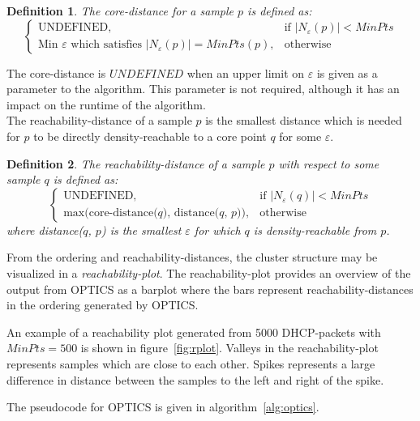 \documentclass[a4paper]{report}
\newtheorem*{definition}{Definition}
\begin{document}
\begin{definition}
    The core-distance for a sample $p$ is defined as:
\[
    \begin{cases}
        \text{UNDEFINED}, & \text{if $|N_{\varepsilon}(p)| < MinPts$}\\
        \text{Min $\varepsilon$ which satisfies  $|N_{\varepsilon}(p)| = MinPts$}(p), & \text{otherwise}
    \end{cases}
\]
\end{definition}

The core-distance is $UNDEFINED$ when an upper limit on $\varepsilon$ is
given as a parameter to the algorithm. This parameter is not required,
although it has an impact on the runtime of the algorithm.
\\[0.5cm]
The reachability-distance of a sample $p$ is the smallest distance which is
needed for $p$ to be directly density-reachable to a core point $q$ for some
$\varepsilon$. 

\begin{definition}
    The reachability-distance of a sample $p$ with respect to some sample $q$
    is defined as:
\[
    \begin{cases}
        \text{UNDEFINED}, & \text{if $|N_{\varepsilon}(q)| < MinPts$}\\
        \text{max(core-distance($q$), distance($q$, $p$))}, & \text{otherwise}
    \end{cases}
\]
    where distance($q$, $p$) is the smallest $\varepsilon$ for which $q$ is
    density-reachable from $p$.
\end{definition}

From the ordering and reachability-distances, the cluster structure may be
visualized in a \emph{reachability-plot}. The reachability-plot provides an
overview of the output from OPTICS as a barplot where the bars represent
reachability-distances in the ordering generated by OPTICS.

An example of a reachability plot generated from 5000 DHCP-packets with 
$MinPts = 500$ is shown in figure~\ref{fig:rplot}. Valleys in the
reachability-plot represents samples which are close to each other. Spikes
represents a large difference in distance between the samples to the left and
right of the spike.

The pseudocode for OPTICS is given in algorithm~\ref{alg:optics}.
\end{document}
